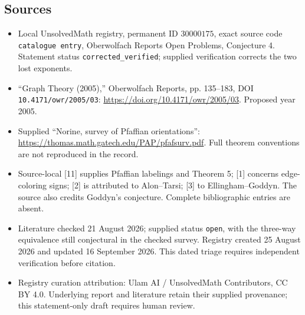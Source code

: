 \documentclass[11pt]{article}
\begin{document}
\subsection{Sources}
\begin{itemize}
\item Local UnsolvedMath registry, permanent ID \(30000175\), exact source code \texttt{catalogue entry}, Oberwolfach Reports Open Problems, Conjecture 4. Statement status \texttt{corrected\_verified}; supplied verification corrects the two lost exponents.
\item ``Graph Theory (2005),'' Oberwolfach Reports, pp. 135--183, DOI \texttt{10.4171/owr/2005/03}: \url{https://doi.org/10.4171/owr/2005/03}. Proposed year 2005.
\item Supplied ``Norine, survey of Pfaffian orientations'': \url{https://thomas.math.gatech.edu/PAP/pfafsurv.pdf}. Full theorem conventions are not reproduced in the record.
\item Source-local [11] supplies Pfaffian labelings and Theorem 5; [1] concerns edge-coloring signs; [2] is attributed to Alon--Tarsi; [3] to Ellingham--Goddyn. The source also credits Goddyn's conjecture. Complete bibliographic entries are absent.
\item Literature checked 21 August 2026; supplied status \texttt{open}, with the three-way equivalence still conjectural in the checked survey. Registry created 25 August 2026 and updated 16 September 2026. This dated triage requires independent verification before citation.
\item Registry curation attribution: Ulam AI / UnsolvedMath Contributors, CC BY 4.0. Underlying report and literature retain their supplied provenance; this statement-only draft requires human review.
\end{itemize}
\end{document}
